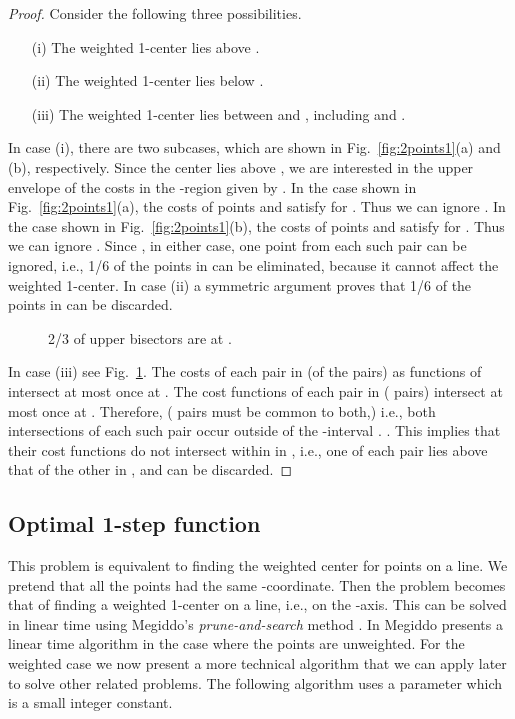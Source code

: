 \documentclass[preprint,10pt]{elsarticle}
\begin{document}
\begin{proof}
Consider the following three possibilities.
\begin{enumerate}
\item[(i)]
The weighted 1-center lies above .
\item[(ii)]
The weighted 1-center lies below .
\item[(iii)]
The weighted 1-center lies between  and ,
including  and .
\end{enumerate}

In case (i), there are two subcases,
which are shown in Fig.~\ref{fig:2points1}(a) and (b), respectively.
Since the center lies above , 
we are interested in the upper envelope of the costs in the 
-region given by .
In the case shown in Fig.~\ref{fig:2points1}(a),
the costs of points  and  satisfy  for .
Thus we can ignore .
In the case shown in Fig.~\ref{fig:2points1}(b),
 the costs of points  and  satisfy
 for .
Thus we can ignore .
Since ,
in either case, one point from each such pair can be ignored,
i.e., 1/6 of the points in  can be eliminated, because it cannot affect the weighted 1-center.
In case (ii) a symmetric argument proves that 1/6 of the points in  can be discarded.

\begin{figure}[ht]
\centering
{}
\hspace{2mm}
\caption{2/3 of upper bisectors are at .}
\label{fig:2points3}
\end{figure}

In case (iii) see Fig.~\ref{fig:2points3}.
The costs of each pair in  (of the  pairs) as functions of  intersect at most once at .
The cost functions of each pair in  ( pairs) intersect at most once at .
Therefore,   ( pairs must be common to both,)
i.e., both intersections of each such pair occur outside of the -interval .
.
This implies that their cost functions do not intersect within in ,
i.e., one of each pair lies above that of the other in ,
and can be discarded.
\end{proof}


\subsection{Optimal 1-step function}\label{sec:1step}
This problem is equivalent to finding the weighted center for  points on a line.
We pretend that all the points had the same -coordinate.
Then the problem becomes that of finding a weighted 1-center on a line,
i.e., on the -axis.
This can be solved in linear time using Megiddo's {\em prune-and-search} method \cite{bhattacharya2007,chen2015a,megiddo1983a}.
In \cite{megiddo1983b} Megiddo presents a linear time algorithm in the case where the
points are unweighted. 
For the weighted case we now present a more technical algorithm that we can apply
later to solve other related problems.
The following algorithm uses a parameter  which is a small integer constant.
\end{document}
